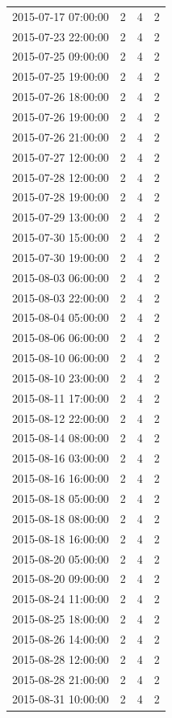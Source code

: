 \begin{tabular}{lrrr}
2015-07-17 07:00:00 & 2 & 4 & 2 \\
2015-07-23 22:00:00 & 2 & 4 & 2 \\
2015-07-25 09:00:00 & 2 & 4 & 2 \\
2015-07-25 19:00:00 & 2 & 4 & 2 \\
2015-07-26 18:00:00 & 2 & 4 & 2 \\
2015-07-26 19:00:00 & 2 & 4 & 2 \\
2015-07-26 21:00:00 & 2 & 4 & 2 \\
2015-07-27 12:00:00 & 2 & 4 & 2 \\
2015-07-28 12:00:00 & 2 & 4 & 2 \\
2015-07-28 19:00:00 & 2 & 4 & 2 \\
2015-07-29 13:00:00 & 2 & 4 & 2 \\
2015-07-30 15:00:00 & 2 & 4 & 2 \\
2015-07-30 19:00:00 & 2 & 4 & 2 \\
2015-08-03 06:00:00 & 2 & 4 & 2 \\
2015-08-03 22:00:00 & 2 & 4 & 2 \\
2015-08-04 05:00:00 & 2 & 4 & 2 \\
2015-08-06 06:00:00 & 2 & 4 & 2 \\
2015-08-10 06:00:00 & 2 & 4 & 2 \\
2015-08-10 23:00:00 & 2 & 4 & 2 \\
2015-08-11 17:00:00 & 2 & 4 & 2 \\
2015-08-12 22:00:00 & 2 & 4 & 2 \\
2015-08-14 08:00:00 & 2 & 4 & 2 \\
2015-08-16 03:00:00 & 2 & 4 & 2 \\
2015-08-16 16:00:00 & 2 & 4 & 2 \\
2015-08-18 05:00:00 & 2 & 4 & 2 \\
2015-08-18 08:00:00 & 2 & 4 & 2 \\
2015-08-18 16:00:00 & 2 & 4 & 2 \\
2015-08-20 05:00:00 & 2 & 4 & 2 \\
2015-08-20 09:00:00 & 2 & 4 & 2 \\
2015-08-24 11:00:00 & 2 & 4 & 2 \\
2015-08-25 18:00:00 & 2 & 4 & 2 \\
2015-08-26 14:00:00 & 2 & 4 & 2 \\
2015-08-28 12:00:00 & 2 & 4 & 2 \\
2015-08-28 21:00:00 & 2 & 4 & 2 \\
2015-08-31 10:00:00 & 2 & 4 & 2 \\

\end{tabular}
